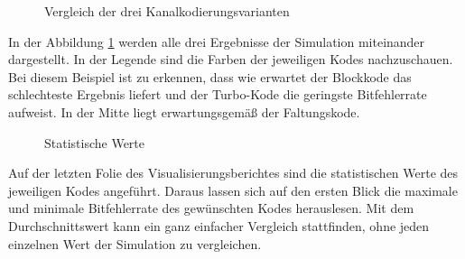 \begin{figure}[!ht]
\centering
{}
\caption{Vergleich der drei Kanalkodierungsvarianten}
\label{pic:ChannelcodingSimulation}
\end{figure}

In der Abbildung \ref{pic:ChannelcodingSimulation} werden alle drei Ergebnisse der Simulation miteinander dargestellt. In der Legende sind die Farben der jeweiligen Kodes nachzuschauen. Bei diesem Beispiel ist zu erkennen, dass wie erwartet der Blockkode das schlechteste Ergebnis liefert und der Turbo-Kode die geringste Bitfehlerrate aufweist. In der Mitte liegt erwartungsgemäß der Faltungskode.

\begin{figure}[!ht]
\centering
{}
\caption{Statistische Werte}
\label{pic:ChannelcodingSimulationStatistic}
\end{figure}

Auf der letzten Folie des Visualisierungsberichtes sind die statistischen Werte des jeweiligen Kodes angeführt. Daraus lassen sich auf den ersten Blick die maximale und minimale Bitfehlerrate des gewünschten Kodes herauslesen. Mit dem Durchschnittswert kann ein ganz einfacher Vergleich stattfinden, ohne jeden einzelnen Wert der Simulation zu vergleichen.